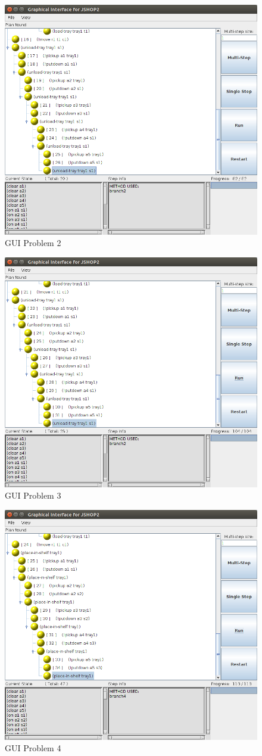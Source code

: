 \documentclass[paper=a4, fontsize=11pt]{scrartcl}
\begin{document}
	\begin{figure}[h!]
	\centering
	\includegraphics[width=0.65\linewidth]{images/problem2_gui}
	\caption{GUI Problem 2}
	\label{fig:problem2_gui}
	\end{figure}
	
	
	\begin{figure}[h!]
	\centering
	\includegraphics[width=0.65\linewidth]{images/problem3_gui}
	\caption{GUI Problem 3}
	\label{fig:problem3_gui}
	\end{figure}
	
	\begin{figure}[h!]
	\centering
	\includegraphics[width=0.65\linewidth]{images/problem4_gui}
	\caption{GUI Problem 4}
	\label{fig:problem4_gui}
	\end{figure}
	
\end{document}
